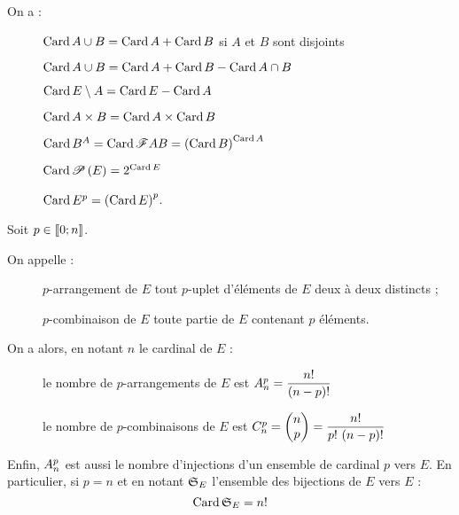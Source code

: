 On a :

\begin{description}
    \item[] \(\Card A\union B=\Card A+\Card B\) si \(A\) et \(B\) sont disjoints \\
    \item[] \(\Card A\union B=\Card A+\Card B-\Card A\inter B\) \\
    \item[] \(\Card E\excluant A=\Card E-\Card A\) \\
    \item[] \(\Card A\times B=\Card A\times\Card B\) \\
    \item[] \(\Card B^A=\Card\F{A}{B}=\paren{\Card B}^{\Card A}\) \\
    \item[] \(\Card\P{E}=2^{\Card E}\) \\
    \item[] \(\Card E^p=\paren{\Card E}^p\).
\end{description}

Soit \(p\in\interventierii{0}{n}\).

On appelle :

\begin{description}
    \item[] \(p\)-arrangement de \(E\) tout \(p\)-uplet d'éléments de \(E\) deux à deux distincts ; \\
    \item[] \(p\)-combinaison de \(E\) toute partie de \(E\) contenant \(p\) éléments.
\end{description}

On a alors, en notant \(n\) le cardinal de \(E\) :

\begin{description}
    \item[] le nombre de \(p\)-arrangements de \(E\) est \(\arr{p}{n}=\dfrac{n!}{\paren{n-p}!}\) \\
    \item[] le nombre de \(p\)-combinaisons de \(E\) est \(\comb{p}{n}=\binom{p}{n}=\dfrac{n!}{p!\,\paren{n-p}!}\)
\end{description}

Enfin, \(\arr{p}{n}\) est aussi le nombre d'injections d'un ensemble de cardinal \(p\) vers \(E\). En particulier, si \(p=n\) et en notant \(\S{E}\) l'ensemble des bijections de \(E\) vers \(E\) : \[\Card\S{E}=n!\]


